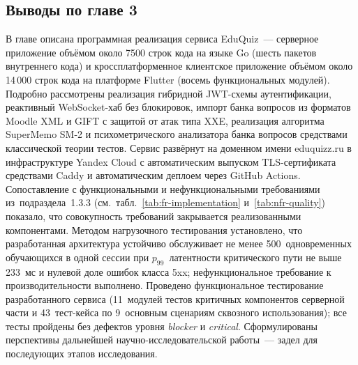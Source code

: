 \subsection*{\hspace*{1.25cm}Выводы по главе 3}
В главе описана программная реализация сервиса EduQuiz~---
серверное приложение объёмом около 7500 строк кода на языке Go
(шесть пакетов внутреннего кода) и кроссплатформенное клиентское
приложение объёмом около 14\,000 строк кода на платформе Flutter
(восемь функциональных модулей). Подробно рассмотрены реализация
гибридной JWT-схемы аутентификации, реактивный WebSocket-хаб без
блокировок, импорт банка вопросов из форматов Moodle XML и GIFT
с защитой от атак типа XXE, реализация алгоритма SuperMemo SM-2
и психометрического анализатора банка вопросов средствами
классической теории тестов. Сервис развёрнут на доменном имени
eduquizz.ru в инфраструктуре Yandex Cloud с автоматическим
выпуском TLS-сертификата средствами Caddy и автоматическим
деплоем через GitHub Actions. Сопоставление с функциональными
и нефункциональными требованиями из~подраздела~1.3.3
(см.~табл.~\ref{tab:fr-implementation} и~\ref{tab:nfr-quality})
показало, что совокупность требований закрывается реализованными
компонентами. Методом нагрузочного тестирования установлено,
что разработанная архитектура устойчиво обслуживает не менее
500~одновременных обучающихся в одной сессии при
$p_{99}$~латентности критического пути не выше 233~мс и нулевой
доле ошибок класса 5xx; нефункциональное требование
к производительности выполнено. Проведено функциональное
тестирование разработанного сервиса (11~модулей тестов
критичных компонентов серверной части и 43~тест-кейса
по 9~основным сценариям сквозного использования); все тесты
пройдены без дефектов уровня \emph{blocker} и \emph{critical}.
Сформулированы перспективы дальнейшей научно-исследовательской
работы~--- задел для последующих этапов исследования.

\newpage
